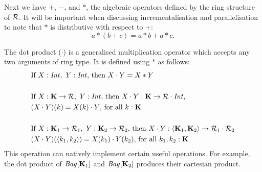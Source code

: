 {{{Next we have $+$, $-$, and $\ast$, the algebraic operators defined by the ring structure of $\mathcal{R}$. It will be important when discussing incrementalisation and parallelisation to note that  $\ast$ is distributive with respect to $+$:
\[
a*(b + c) = a*b + a*c.
\]

The dot product ($\cdot$) is a generalised multiplication operator which accepts any two arguments of ring type. It is defined using $*$ as follows:
\begin{equation*}
\begin{split}
& \textrm{If } X: \textrm{\textit{Int}}, \ Y: \textrm{\textit{Int}}\textrm{, then } X \cdot Y = X * Y \\ \\
& \textrm{If } X: \mathbf{K} \rightarrow \mathcal{R}, \ Y: \textrm{\textit{Int}}\textrm{, then } X \cdot Y : \mathbf{K} \rightarrow \mathcal{R} \cdot \textrm{\textit{Int}}, \\
& (X \cdot Y)(k) = X(k) \cdot Y\textrm{, for all }k: \mathbf{K} \\ \\
& \textrm{If } X: \mathbf{K}_1 \rightarrow \mathcal{R}_1, \ Y: \mathbf{K}_2 \rightarrow \mathcal{R}_2\textrm{, then } X \cdot Y : \langle \mathbf{K}_1, \mathbf{K}_2 \rangle \rightarrow \mathcal{R}_1 \cdot \mathcal{R}_2 \\
& (X \cdot Y)(\langle k_1, k_2 \rangle) = X(k_1) \cdot Y(k_2)\textrm{, for all }k_1,k_2: \mathbf{K}
\end{split}
\end{equation*}
This operation can natively implement certain useful operations. For example, the dot product of $\textrm{\textit{Bag}}[\mathbf{K}_1]$ and $\textrm{\textit{Bag}}[\mathbf{K}_2]$ produces their cartesian product.

}}}
